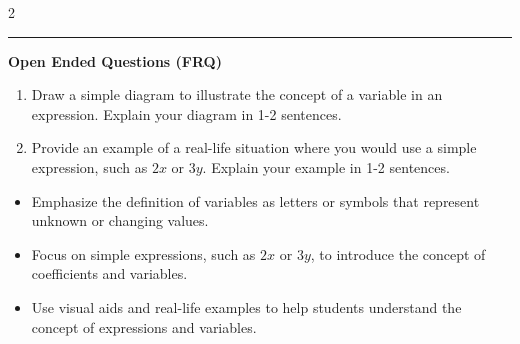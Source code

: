 \documentclass[10pt]{article}
\begin{document}
\begin{multicols}{2}
\begin{enumerate}[label=\textbf{Q\arabic*.}, leftmargin=*, itemsep=6pt, parsep=0pt]
\end{enumerate}
\end{multicols}

\vspace{-0.2cm}
\hrule
\vspace{0.2cm}
\textbf{\small Open Ended Questions (FRQ)}
\begin{enumerate}[label=\textbf{Q\arabic*.}, start=9, itemsep=5pt, topsep=0pt]

  \item \small Draw a simple diagram to illustrate the concept of a variable in an expression. Explain your diagram in 1-2 sentences. \vspace{1.2000000000000002cm}

  \item \small Provide an example of a real-life situation where you would use a simple expression, such as $2x$ or $3y$. Explain your example in 1-2 sentences. \vspace{1.2000000000000002cm}

\end{enumerate}

\vfill

\begin{tcolorbox}[colback=blue!5, colframe=mainblue!50, title=\small \textbf{Chef's Tips}, fonttitle=\bfseries, bottom=1mm]
\begin{itemize}[noitemsep, topsep=2pt, leftmargin=0.5cm]
  \item \scriptsize Emphasize the definition of variables as letters or symbols that represent unknown or changing values.\item \scriptsize Focus on simple expressions, such as $2x$ or $3y$, to introduce the concept of coefficients and variables.\item \scriptsize Use visual aids and real-life examples to help students understand the concept of expressions and variables.
\end{itemize}
\end{tcolorbox}
\end{document}
